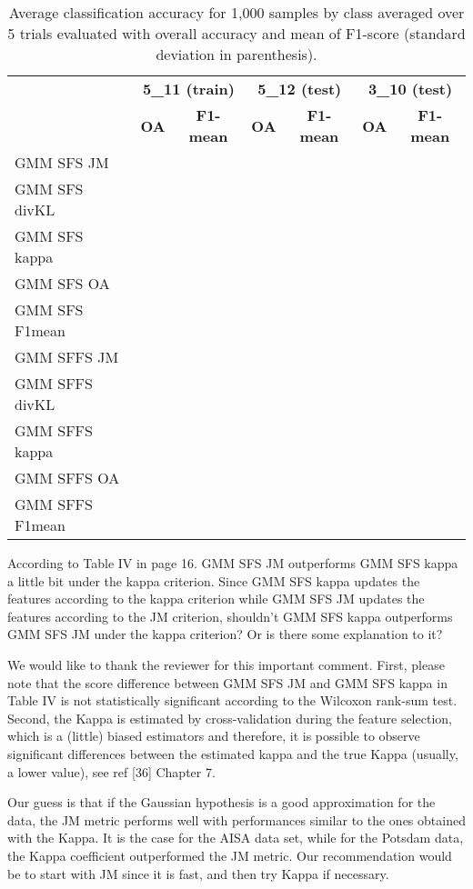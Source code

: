 \documentclass[a4paper,10pt,DIV=16]{scrartcl}
\begin{document}
    \begin{table}[!t]
        \centering
        \caption{Average classification accuracy for 1,000 samples by class averaged over 5 trials  evaluated with overall accuracy and mean of F1-score (standard deviation in parenthesis).\label{tab:potsdam-otbsimu-othereval}}
        \begin{tabular}{lcccccc}\toprule
             & \multicolumn{2}{c}{\bfseries 5\_11 (train)} & \multicolumn{2}{c}{\bfseries 5\_12 (test)} & \multicolumn{2}{c}{\bfseries 3\_10 (test)} \\ \cmidrule{2-7}
             & {\bfseries OA} & {\bfseries F1-mean} & {\bfseries OA} & {\bfseries F1-mean} & {\bfseries OA} & {\bfseries F1-mean} \\ \cmidrule{2-7}

            GMM SFS JM &      &&&&&\\
            GMM SFS divKL &   &&&&&\\
            GMM SFS kappa &   &&&&&\\
            GMM SFS OA &      &&&&&\\
            GMM SFS F1mean &  &&&&&\\
            GMM SFFS JM &     &&&&&\\
            GMM SFFS divKL &  &&&&&\\
            GMM SFFS kappa &  &&&&&\\
            GMM SFFS OA &     &&&&&\\
            GMM SFFS F1mean & &&&&&\\
            \bottomrule
        \end{tabular}
    \end{table}


\begin{revbox}
  According to Table IV in page 16. GMM SFS JM outperforms GMM SFS kappa a little bit under the kappa criterion. Since GMM SFS kappa updates the features according to the kappa criterion while GMM SFS JM updates the features according to the JM criterion, shouldn’t GMM SFS kappa outperforms GMM SFS JM under the kappa criterion? Or is there some explanation to it?
  \begin{resbox}
    We would like to thank the reviewer for this important comment. First, please note that the score difference between GMM SFS JM and GMM SFS kappa in Table IV is not statistically significant according to the Wilcoxon rank-sum test. Second, the Kappa is estimated by cross-validation during the feature selection, which is a (little) biased estimators and therefore, it is possible to observe significant differences between the estimated kappa and the true Kappa (usually, a lower value), see ref [36] Chapter 7.

    Our guess is that if the Gaussian hypothesis is a good approximation for the data, the JM metric performs well  with  performances similar to the ones obtained with the Kappa. It is the case for the AISA data set, while for the Potsdam data, the Kappa coefficient outperformed the JM metric. Our recommendation would be to start with JM since it is fast, and then try Kappa if necessary.
  \end{resbox}
\end{revbox}
\end{document}
